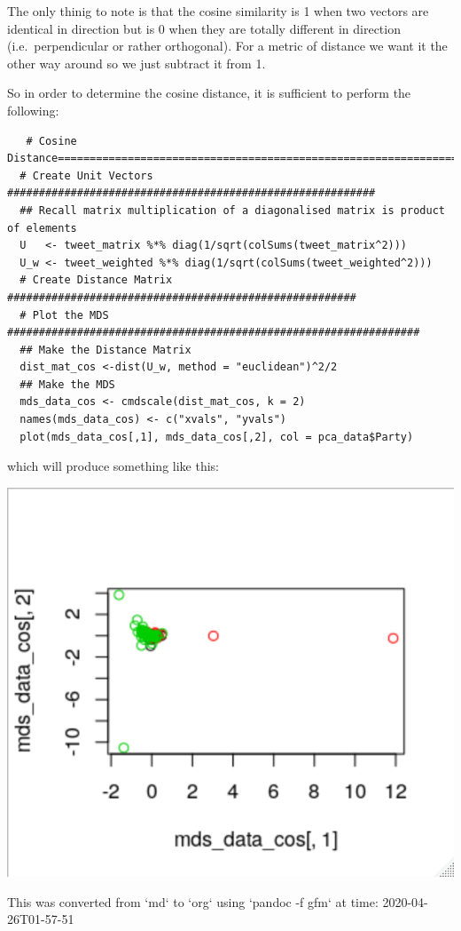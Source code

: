 \documentclass[11pt]{article}
\begin{document}
\begin{enumerate}
The only thinig to note is that the cosine similarity is 1 when two
vectors are identical in direction but is 0 when they are totally
different in direction (i.e. perpendicular or rather orthogonal). For a
metric of distance we want it the other way around so we just subtract
it from 1.

So in order to determine the cosine distance, it is sufficient to
perform the following:

\begin{verbatim}
   # Cosine Distance===============================================================
  # Create Unit Vectors ##########################################################
  ## Recall matrix multiplication of a diagonalised matrix is product of elements
  U   <- tweet_matrix %*% diag(1/sqrt(colSums(tweet_matrix^2)))
  U_w <- tweet_weighted %*% diag(1/sqrt(colSums(tweet_weighted^2)))
  # Create Distance Matrix #######################################################
  # Plot the MDS #################################################################
  ## Make the Distance Matrix
  dist_mat_cos <-dist(U_w, method = "euclidean")^2/2
  ## Make the MDS
  mds_data_cos <- cmdscale(dist_mat_cos, k = 2)
  names(mds_data_cos) <- c("xvals", "yvals")
  plot(mds_data_cos[,1], mds_data_cos[,2], col = pca_data$Party)
\end{verbatim}

which will produce something like this:

\begin{center}
\includegraphics[width=.9\linewidth]{./media/20200426101157206_1262456543.png}
\end{center}

This was converted from `md` to `org` using `pandoc -f gfm` at time:
2020-04-26T01-57-51
\end{enumerate}
\end{document}
